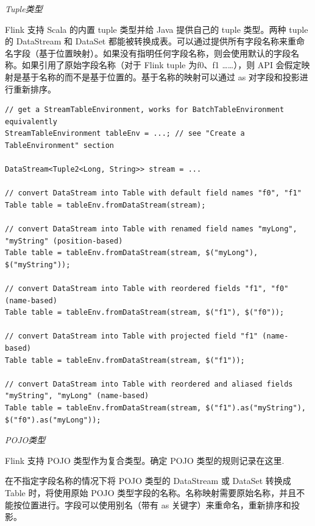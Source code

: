\documentclass[cn,11pt,chinese]{elegantbook}
\begin{document}
\textit{Tuple类型}

Flink 支持 Scala 的内置 tuple 类型并给 Java 提供自己的 tuple 类型。两种 tuple 的 DataStream 和 DataSet 都能被转换成表。可以通过提供所有字段名称来重命名字段（基于位置映射）。如果没有指明任何字段名称，则会使用默认的字段名称。如果引用了原始字段名称（对于 Flink tuple 为f0、f1 ……），则 API 会假定映射是基于名称的而不是基于位置的。基于名称的映射可以通过 as 对字段和投影进行重新排序。

\begin{verbatim}
// get a StreamTableEnvironment, works for BatchTableEnvironment equivalently
StreamTableEnvironment tableEnv = ...; // see "Create a TableEnvironment" section

DataStream<Tuple2<Long, String>> stream = ...

// convert DataStream into Table with default field names "f0", "f1"
Table table = tableEnv.fromDataStream(stream);

// convert DataStream into Table with renamed field names "myLong", "myString" (position-based)
Table table = tableEnv.fromDataStream(stream, $("myLong"), $("myString"));

// convert DataStream into Table with reordered fields "f1", "f0" (name-based)
Table table = tableEnv.fromDataStream(stream, $("f1"), $("f0"));

// convert DataStream into Table with projected field "f1" (name-based)
Table table = tableEnv.fromDataStream(stream, $("f1"));

// convert DataStream into Table with reordered and aliased fields "myString", "myLong" (name-based)
Table table = tableEnv.fromDataStream(stream, $("f1").as("myString"), $("f0").as("myLong"));
\end{verbatim}

\textit{POJO类型}

Flink 支持 POJO 类型作为复合类型。确定 POJO 类型的规则记录在这里.

在不指定字段名称的情况下将 POJO 类型的 DataStream 或 DataSet 转换成 Table 时，将使用原始 POJO 类型字段的名称。名称映射需要原始名称，并且不能按位置进行。字段可以使用别名（带有 as 关键字）来重命名，重新排序和投影。
\end{document}
